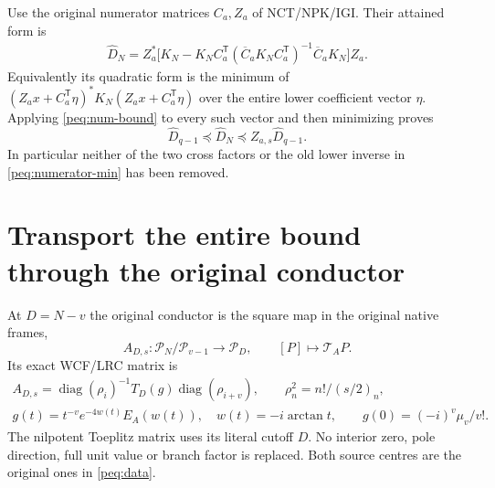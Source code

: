 \documentclass[11pt,a4paper]{article}
\DeclareMathOperator{\diag}{diag}
\begin{document}
Use the original numerator matrices $C_a,Z_a$ of NCT/NPK/IGI. Their attained form is
\begin{equation}
\begin{split}
 \widehat D_N=Z_a^*\bigl[ K_N-K_NC_a^{\mathsf T}
 (\overline C_aK_NC_a^{\mathsf T})^{-1}
                  \overline C_aK_N\bigr]Z_a.
\end{split}\label{peq:numerator-min}
\end{equation}
Equivalently its quadratic form is the minimum of
$(Z_ax+C_a^{\mathsf T}\eta)^*K_N(Z_ax+C_a^{\mathsf T}\eta)$ over the entire lower coefficient vector $\eta$. Applying \eqref{peq:num-bound} to every such vector and then minimizing proves
\begin{equation}
 \widehat D_{q-1}\preceq\widehat D_N
                  \preceq Z_{a,s}\widehat D_{q-1}.
 \label{peq:numerator-order}
\end{equation}
In particular neither of the two cross factors or the old lower inverse in \eqref{peq:numerator-min} has been removed.

\section{Transport the entire bound through the original conductor}
At $D=N-v$ the original conductor is the square map in the original native frames,
\[
 A_{D,s}:\mathcal P_N/\mathcal P_{v-1}\longrightarrow\mathcal P_D,
 \qquad[P]\longmapsto\mathcal T_AP.
\]
Its exact WCF/LRC matrix is
\begin{equation}
\begin{gathered}
 A_{D,s}=\diag(\rho_i)^{-1}T_D(g)\diag(\rho_{i+v}),\qquad
 \rho_n^2=n!/(s/2)_n,\\
 g(t)=t^{-v}e^{-4w(t)}E_A(w(t)),\quad w(t)=-i\arctan t,\qquad
 g(0)=(-i)^v\mu_v/v!.
\end{gathered}\label{peq:conductor}
\end{equation}
The nilpotent Toeplitz matrix uses its literal cutoff $D$. No interior zero, pole direction, full unit value or branch factor is replaced. Both source centres are the original ones in \eqref{peq:data}.
\end{document}
